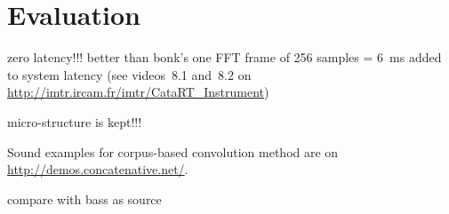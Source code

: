 \section{Evaluation}\label{sec:eval}

zero latency!!! better than bonk's one FFT frame of 256 samples = 6~ms added to system latency
(see videos~8.1 and~8.2 on \url{http://imtr.ircam.fr/imtr/CataRT_Instrument})

micro-structure is kept!!!

Sound examples for corpus-based convolution method are on \url{http://demos.concatenative.net/}.

compare with bass as source
